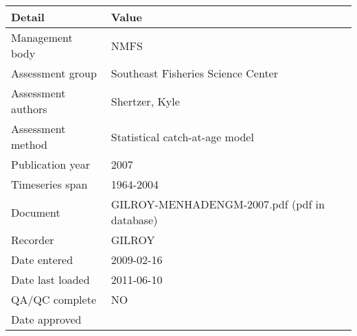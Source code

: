 \begin{table}[htb]
\centering
\begin{tabular}{lp{7cm}}
\toprule
Detail & Value \\
\midrule
Management body    & NMFS                                         \\
Assessment group   & Southeast Fisheries Science Center           \\
Assessment authors & Shertzer, Kyle                               \\
Assessment method  & Statistical catch-at-age model               \\
Publication year   & 2007                                         \\
Timeseries span    & 1964-2004                                    \\
Document           & GILROY-MENHADENGM-2007.pdf (pdf in database) \\
Recorder           & GILROY                                       \\
Date entered       & 2009-02-16                                   \\
Date last loaded   & 2011-06-10                                   \\
QA/QC complete     & NO                                           \\
Date approved      &                                              \\
\bottomrule
\end{tabular}
\label{tab:assessdet}
\end{table}
